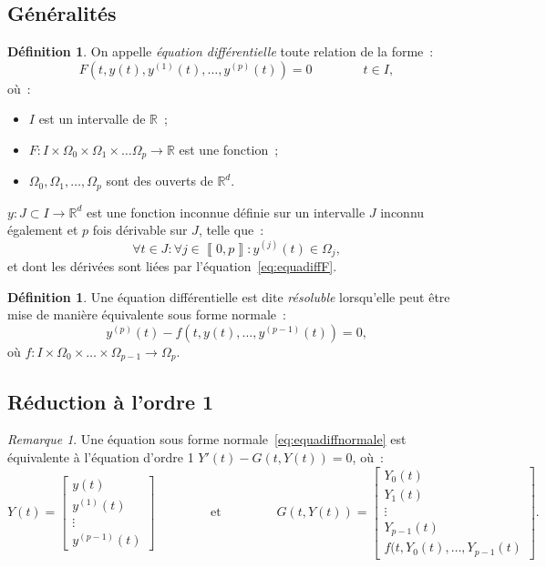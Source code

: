 \documentclass{report}
\theoremstyle{definition}
\newtheorem{déf}[thm]{Définition}
\theoremstyle{remark}
\newtheorem*{rmq}{Remarque}
\numberwithin{equation}{section}
\newcommand{\R}{\mathbb R}
\newcommand{\intint}[2]{\left\llbracket#1, #2\right\rrbracket}
\begin{document}
		\subsection{Généralités}
			\begin{déf} On appelle \textit{équation différentielle} toute relation de la forme~:
			\begin{equation}\label{eq:equadiffF}
				F(t, y(t), y^{(1)}(t), \ldots, y^{(p)}(t)) = 0\qquad\qquad t \in I,
			\end{equation}
			où~:
			\begin{itemize}
				\item $I$ est un intervalle de $\R$~;
				\item $F : I \times \Omega_0 \times \Omega_1 \times \ldots \Omega_p \to \R$ est une fonction~;
				\item $\Omega_0, \Omega_1, \ldots, \Omega_p$ sont des ouverts de $\R^d$.
			\end{itemize}
			$y : J \subset I \to \R^d$ est une fonction inconnue définie sur un intervalle $J$ inconnu également et $p$ fois dérivable sur $J$, telle que~:
			\begin{equation}
				\forall t \in J : \forall j \in \intint 0p : y^{(j)}(t) \in \Omega_j,
			\end{equation}
			et dont les dérivées sont liées par l'équation~\eqref{eq:equadiffF}.
			\end{déf}

			\begin{déf} Une équation différentielle est dite \textit{résoluble} lorsqu'elle peut être mise de manière équivalente sous forme normale~:
			\begin{equation}\label{eq:equadiffnormale}
				y^{(p)}(t) - f(t, y(t), \ldots, y^{(p-1)}(t)) = 0,
			\end{equation}
			où $f : I \times \Omega_0 \times \ldots \times \Omega_{p-1} \to \Omega_p$.
			\end{déf}

		\subsection{Réduction à l'ordre 1}
			\begin{rmq} Une équation sous forme normale~\eqref{eq:equadiffnormale} est équivalente à l'équation d'ordre 1 $Y'(t) - G(t, Y(t)) = 0$, où~:
			\begin{equation}
				Y(t) = \begin{bmatrix}y(t) \\y^{(1)}(t) \\ \vdots \\ y^{(p-1)}(t)\end{bmatrix} \qquad\qquad \text{ et } \qquad\qquad
			G(t, Y(t)) = \begin{bmatrix}Y_0(t) \\ Y_1(t) \\ \vdots \\ Y_{p-1}(t) \\ f(t, Y_0(t), \ldots, Y_{p-1}(t)\end{bmatrix}.
			\end{equation}
			\end{rmq}
\end{document}
